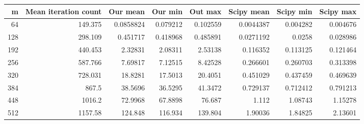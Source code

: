 \begin{tabular}{rrrrrrrr}
\hline
   m &   Mean iteration count &    Our mean &    Our min &    Out max &   Scipy mean &   Scipy min &   Scipy max \\
\hline
  64 &                149.375 &   0.0858824 &   0.079212 &   0.102559 &    0.0044387 &    0.004282 &    0.004676 \\
 128 &                298.109 &   0.451717  &   0.418968 &   0.485891 &    0.0271192 &    0.0258   &    0.028986 \\
 192 &                440.453 &   2.32831   &   2.08311  &   2.53138  &    0.116352  &    0.113125 &    0.121464 \\
 256 &                587.766 &   7.69817   &   7.12515  &   8.42528  &    0.266601  &    0.260703 &    0.313398 \\
 320 &                728.031 &  18.8281    &  17.5013   &  20.4051   &    0.451029  &    0.437459 &    0.469639 \\
 384 &                867.5   &  38.5696    &  36.5295   &  41.3472   &    0.729137  &    0.712412 &    0.791213 \\
 448 &               1016.2   &  72.9968    &  67.8898   &  76.687    &    1.112     &    1.08743  &    1.15278  \\
 512 &               1157.58  & 124.848     & 116.934    & 139.804    &    1.90036   &    1.84825  &    2.13601  \\
\hline
\end{tabular}
